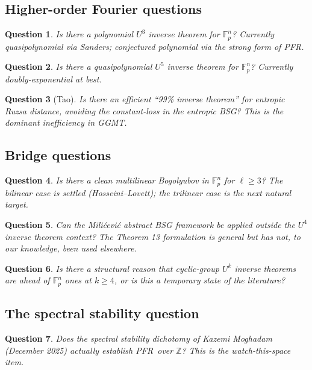 \documentclass[11pt,a4paper]{article}
\theoremstyle{plain}
\newtheorem*{question}{Question}
\theoremstyle{definition}
\theoremstyle{remark}
\newcommand{\F}{\mathbb{F}}
\newcommand{\Z}{\mathbb{Z}}
\newcommand{\PFR}{\textsf{PFR}}
\begin{document}
\subsection{Higher-order Fourier questions}

\begin{question}
Is there a polynomial $U^3$ inverse theorem for $\F_p^n$? Currently quasipolynomial via Sanders; conjectured polynomial via the strong form of \PFR.
\end{question}

\begin{question}
Is there a quasipolynomial $U^5$ inverse theorem for $\F_p^n$? Currently doubly-exponential at best.
\end{question}

\begin{question}[Tao]
Is there an efficient ``99\% inverse theorem'' for entropic Ruzsa distance, avoiding the constant-loss in the entropic BSG? This is the dominant inefficiency in GGMT.
\end{question}

\subsection{Bridge questions}

\begin{question}
Is there a clean multilinear Bogolyubov in $\F_p^n$ for $\ell \geq 3$? The bilinear case is settled (Hosseini--Lovett); the trilinear case is the next natural target.
\end{question}

\begin{question}
Can the Milićević abstract BSG framework be applied outside the $U^4$ inverse theorem context? The Theorem 13 formulation is general but has not, to our knowledge, been used elsewhere.
\end{question}

\begin{question}
Is there a structural reason that cyclic-group $U^k$ inverse theorems are ahead of $\F_p^n$ ones at $k \geq 4$, or is this a temporary state of the literature?
\end{question}

\subsection{The spectral stability question}

\begin{question}\label{q:spectral}
Does the spectral stability dichotomy of Kazemi Moghadam (December 2025) actually establish \PFR\ over $\Z$? This is the watch-this-space item.
\end{question}
\end{document}
